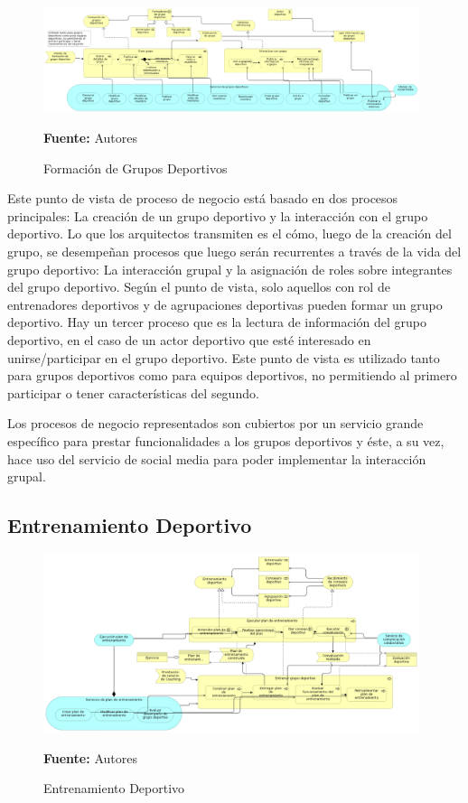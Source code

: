 \begin{figure}[!htb]
  \begin{center}
    \includegraphics[width=11cm]{./imagenes/business_process/formaciongruposdeportivos.png}
    \caption{Formación de Grupos Deportivos}
    \label{fig:bp_formacion_grupos_deportivos}
    \textbf{Fuente:}  Autores
  \end{center}
\end{figure}

Este punto de vista de proceso de negocio está basado en dos procesos principales: La creación de un grupo deportivo y la interacción con el grupo deportivo. Lo que los arquitectos transmiten es el cómo, luego de la creación del grupo, se desempeñan procesos que luego serán recurrentes a través de la vida del grupo deportivo: La interacción grupal y la asignación de roles sobre integrantes del grupo deportivo. Según el punto de vista, solo aquellos con rol de entrenadores deportivos y de agrupaciones deportivas pueden formar un grupo deportivo. Hay un tercer proceso que es la lectura de información del grupo deportivo, en el caso de un actor deportivo que esté interesado en unirse/participar en el grupo deportivo. Este punto de vista es utilizado tanto para grupos deportivos como para equipos deportivos, no permitiendo al primero participar o tener características del segundo.

Los procesos de negocio representados son cubiertos por un servicio grande específico para prestar funcionalidades a los grupos deportivos y éste, a su vez, hace uso del servicio de social media para poder implementar la interacción grupal.

\subsection{Entrenamiento Deportivo}

\begin{figure}[!htb]
  \begin{center}
    \includegraphics[width=11cm]{./imagenes/business_process/entrenamientodeportivo.png}
    \caption{Entrenamiento Deportivo}
    \label{fig:bp_entrenamiento_deportivo}
    \textbf{Fuente:}  Autores
  \end{center}
\end{figure}


